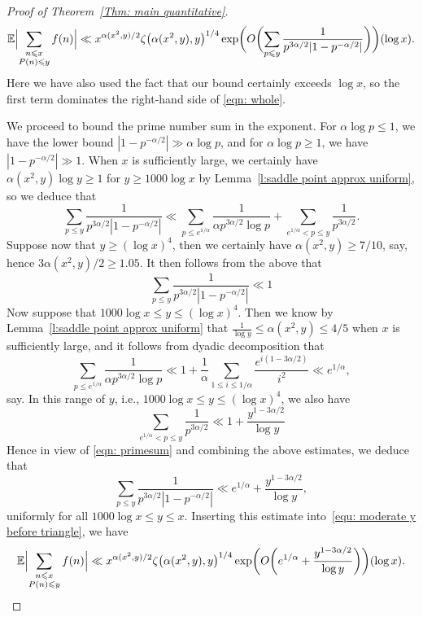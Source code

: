 \documentclass[10pt,a4paper]{amsart}
\def\E{\mathbb E}
\def\leq {\leqslant}
\begin{document}
\begin{proof}[Proof of Theorem~\ref{Thm: main quantitative}]
\begin{equation}\label{equ: moderate y before triangle}
\E \Bigl| \sum_{\substack{n \leq x \\ P(n) \leq y}} f(n) \Bigr| \ll x^{\alpha (x^2, y)/2} \zeta \bigl( \alpha (x^2, y), y \bigr)^{1/4} \exp \biggl( O \biggl( \sum_{p \leq y} \frac{1}{p^{3 \alpha / 2} |1 - p^{-\alpha / 2}|} \biggr) \biggr) (\log x).
\end{equation}
Here we have also used the fact that our bound certainly exceeds $\log x$, so the first term dominates the right-hand side of \eqref{eqn: whole}.

We proceed to bound the prime number sum in the exponent. For $\alpha \log p \leq 1$, we have the lower bound $|1 - p^{-\alpha / 2}| \gg \alpha \log p$, and for $\alpha \log p \geq 1$, we have $|1 - p^{-\alpha / 2}| \gg 1$. When $x$ is sufficiently large, we certainly have $\alpha (x^2, y) \log y \geq 1$ for $y \geq 1000 \log x$ by Lemma~\ref{l:saddle point approx uniform}, so we deduce that
\begin{equation}\label{eqn: primesum}
\sum_{p \leq y} \frac{1}{p^{3 \alpha / 2} |1 - p^{-\alpha / 2}|} \ll \sum_{p \leq e^{1/\alpha}} \frac{1}{\alpha p^{3 \alpha / 2} \log p} + \sum_{e^{1 / \alpha} < p \leq y} \frac{1}{p^{3 \alpha / 2}} . 
\end{equation}
Suppose now that $y \geq (\log x)^{4}$, then we certainly have $\alpha (x^2, y) \geq 7/10$, say, hence $3 \alpha (x^2, y) / 2 \geq 1.05$. It then follows from the above that
\[
\sum_{p \leq y} \frac{1}{p^{3 \alpha / 2} |1 - p^{-\alpha / 2}|} \ll 1
\]
Now suppose that $1000 \log x \leq y \leq (\log x)^4$. Then we know by Lemma~\ref{l:saddle point approx uniform} that $\frac{1}{\log y} \leq \alpha (x^2, y) \leq 4/5$ when $x$ is sufficiently large, and it follows from dyadic decomposition that
\[
\sum_{p \leq e^{1/\alpha}} \frac{1}{\alpha p^{3 \alpha / 2} \log p} \ll 1 + \frac{1}{\alpha} \sum_{1 \leq i \leq 1/\alpha} \frac{e^{i(1 - 3 \alpha / 2)}}{i^2} \ll e^{1/\alpha}  ,
\]
say. In this range of $y$, i.e., $1000 \log x \leq y \leq (\log x)^4$, we also have
\[
\sum_{e^{1 / \alpha} < p \leq y} \frac{1}{p^{3 \alpha / 2}} \ll 1 + \frac{y^{1 - 3 \alpha / 2}}{\log y} \]
 Hence in view of \eqref{eqn: primesum} and combining the above estimates, we deduce that
\[
\sum_{p \leq y} \frac{1}{p^{3 \alpha / 2} |1 - p^{-\alpha / 2}|} \ll e^{1/\alpha} + \frac{y^{1 - 3 \alpha / 2}}{\log y} ,
\]
uniformly for all $1000 \log x \leq y \leq x$. Inserting this estimate into~\eqref{equ: moderate y before triangle}, we have
\[
\E \Bigl| \sum_{\substack{n \leq x \\ P(n) \leq y}} f(n) \Bigr| \ll x^{\alpha (x^2, y) / 2} \zeta \bigl( \alpha (x^2, y), y \bigr)^{1/4} \exp \biggl( O \biggl( e^{1/\alpha} + \frac{y^{1 - 3 \alpha / 2}}{\log y} \biggr) \biggr) (\log x) .
\]
\end{proof}
\end{document}
